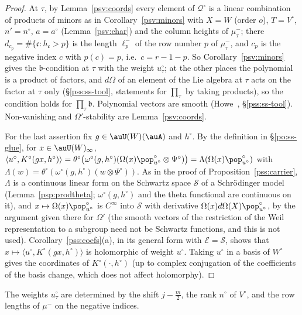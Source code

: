 \documentclass[10pt]{amsart}
\theoremstyle{definition}
\theoremstyle{remark}
\begin{document}
\begin{proof}
At $\tau$, by Lemma~\ref{psv:coords} every element of $\mathcal Q^\circ$ is a linear combination of products of
minors as in Corollary~\ref{psv:minors} with $X=W$ (order $o$), $T=V^\circ$, $n'=n^\circ$, $a=a^\circ$
(Lemma~\ref{psv:char}) and the column heights of $\mu^-_\tau$; there $d_{c_p}=\#\{\mathfrak c:h_{\mathfrak c}>p\}$ is the
length $\ell^-_p$ of the row number $p$ of $\mu^-_\tau$, and $c_p$ is the negative index $c$ with $p(c)=p$,
i.e.\ $c=r-1-p$. So Corollary~\ref{psv:minors} gives the $\mathfrak b$-condition at $\tau$ with the weight
$u^\circ_\tau$; at the other places the polynomial is a product of factors, and $d\Omega$ of an element of the
Lie algebra at $\tau$ acts on the factor at $\tau$ only (\S\ref{pss:ss-tool}, statements for $\prod_\tau$ by
taking products), so the condition holds for $\prod_\tau\mathfrak b$. Polynomial vectors are smooth (Howe~\cite[(2.2)--(2.3)]{HoweJAMS},
\S\ref{pss:ss-tool}). Non-vanishing and $\Omega'$-stability are Lemma~\ref{psv:coords}.

For the last assertion fix $g\in\auU(W)(\auA)$ and $h^\circ$. By the definition in \S\ref{po:ss-glue}, for
$x\in\auU(W)_\infty$, $\langle u^\circ,K^\circ(gx,h^\circ)\rangle=\theta^\circ\bigl(\omega^\circ(g,h^\circ)(\Omega(x)
\pop^\circ_{u^\circ}\otimes\Psi^\circ)\bigr)=\Lambda(\Omega(x)\pop^\circ_{u^\circ})$ with $\Lambda(w)=\theta^\circ(\omega^\circ(g,h^\circ)
(w\otimes\Psi^\circ))$. As in the proof of Proposition~\ref{pss:carrier}, $\Lambda$ is a continuous linear form on
the Schwartz space $\mathcal S$ of a Schr\"odinger model
(Lemma~\ref{psp:prodtheta}; $\omega^\circ(g,h^\circ)$ and the theta functional are continuous on it), and
$x\mapsto\Omega(x)\pop^\circ_{u^\circ}$ is $C^\infty$ into $\mathcal S$ with derivative $\Omega(x)d\Omega(X)\pop^\circ_{u^\circ}$, by the argument given there for $\Omega'$
(the smooth vectors of the restriction of the Weil representation to a subgroup need not be Schwartz functions, and this is not used).
Corollary~\ref{pss:coefs}(a), in its general form with $\mathcal E=\mathcal S$, shows that $x\mapsto\langle u^\circ,K^\circ(gx,h^\circ)\rangle$ is holomorphic of weight
$u^\circ$. Taking $u^\circ$ in a basis of $W^\circ$ gives the coordinates of $K^\circ(\cdot,h^\circ)$ (up to complex
conjugation of the coefficients of the basis change, which does not affect holomorphy).
\end{proof}

\noindent The weights $u^\circ_\tau$ are determined by the shift $j-\frac m2$, the rank $n^\circ$ of $V^\circ$, and the
row lengths of $\mu^-$ on the negative indices.
\end{document}
